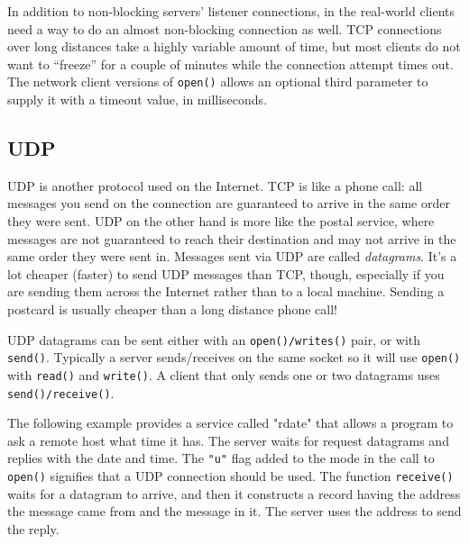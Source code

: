 In addition to non-blocking servers' listener connections, in the real-world
clients need a way to do an almost non-blocking connection as well.
TCP connections over long distances take a highly variable amount of time,
but most clients do not want to ``freeze'' for a couple of minutes while
the connection attempt times out. The network client versions of \texttt{open()}
allows an optional third parameter to supply it with a timeout value,
in milliseconds.

\subsection*{UDP}

UDP is another protocol used on the Internet. TCP is like a
phone call: all messages you send on the connection are guaranteed to
arrive in the same order they were sent. UDP on the other hand is more
like the postal service, where messages are not guaranteed to reach
their destination and may not arrive in the same order they were sent
in. Messages sent via UDP are called \textit{datagrams}.
It's a lot cheaper (faster) to send UDP messages than
TCP, though, especially if you are sending them across the Internet
rather than to a local machine. Sending a postcard is usually cheaper
than a long distance phone call!

UDP datagrams can be sent either with an \texttt{open()/writes()}
pair, or with \texttt{send()}. Typically a server sends/receives on the
same socket so it will use \texttt{open()} with \texttt{read()} and
\texttt{write()}. A client that only sends one or two datagrams uses
\texttt{send()}\texttt{/}\texttt{receive()}.

The following example provides a service called
"rdate" that allows a program to ask a
remote host what time it has. The server waits for request datagrams
and replies with the date and time. The
\texttt{"u"} flag added to the mode in the
call to \texttt{open()} signifies that a UDP connection should be used.
The function \texttt{receive()} waits for a datagram to arrive, and
then it constructs a record having the address the message came from
and the message in it. The server uses the address to send the reply.


